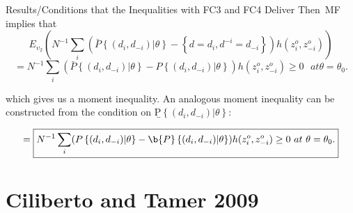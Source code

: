 \begin{frame}{\normalsize Results/Conditions that the Inequalities with FC3 and FC4 Deliver}
 Then\ MF implies that%
\begin{equation*}
E_{\upsilon _{2}}(N^{-1}\sum_{i}(\bar{P}\left\{ (d_{i},d_{-i})|\theta
\right\} -\left\{ d=d_{i},d^{-i}=d_{-i}\right\} )h(z_{i}^{o},z_{-i}^{o}))
\end{equation*}%
\begin{equation*}
=\boxed{N^{-1}\sum_{i}(\bar{P}\left\{ (d_{i},d_{-i})|\theta \right\} -P\left\{
(d_{i},d_{-i})|\theta \right\} )h(z_{i}^{o},z_{-i}^{o})\geq 0\text{ }at\text{
}\theta =\theta _{0}\text{.}}
\end{equation*}

which gives us a moment inequality. An analogous moment inequality can be
constructed from the condition on \b{P}$\left\{ (d_{i},d_{-i})|\theta
\right\}$:

\begin{equation*}
=\boxed{N^{-1}\sum_{i}(P\left\{(d_{i},d_{-i})|\theta \right\} - \b{P}\left\{ (d_{i},d_{-i})|\theta \right\})
h(z_{i}^{o},z_{-i}^{o})\geq 0\text{ }at\text{
}\theta =\theta _{0}\text{.}}
\end{equation*}
\end{frame}


\section{Ciliberto and Tamer 2009}


